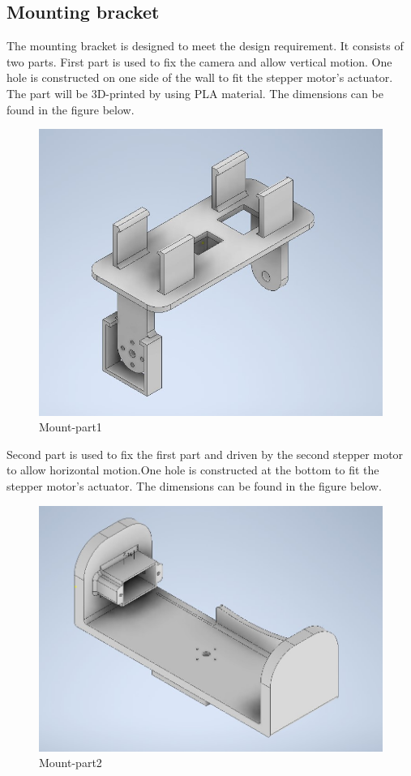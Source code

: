 \documentclass[12pt, titlepage]{article}
\begin{document}
\subsection{Mounting bracket}
The mounting bracket is designed to meet the design requirement. It consists of two parts. First part is used to fix the camera and allow vertical motion. One hole is constructed on one side of the wall to fit the stepper motor's actuator. The part will be 3D-printed by using PLA material. The dimensions can be found in the  figure below.


\begin{figure}[H]
\centering
\includegraphics[width=\textwidth]{mount_part1.jpg}
\caption{Mount-part1}
\end{figure}


Second part is used to fix the first part and driven by the second stepper motor to allow horizontal motion.One hole is constructed at the bottom to fit the stepper motor's actuator. The dimensions can be found in the figure below.

\begin{figure}[H]
\centering
\includegraphics[width=\textwidth]{mount_part2.jpg}
\caption{Mount-part2}
\end{figure}
\end{document}
